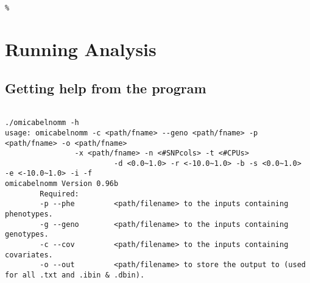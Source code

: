 \documentclass{report}
\begin{document}
\begin{lstlisting}[escapechar=\%]


%
\end{lstlisting}

\chapter{Running Analysis}

\section{Getting help from the program}

\begin{lstlisting}[escapechar=\%]

./omicabelnomm -h
usage: omicabelnomm -c <path/fname> --geno <path/fname> -p <path/fname> -o <path/fname>
                -x <path/fname> -n <#SNPcols> -t <#CPUs>
                         -d <0.0~1.0> -r <-10.0~1.0> -b -s <0.0~1.0>  -e <-10.0~1.0> -i -f
omicabelnomm Version 0.96b
        Required:
        -p --phe         <path/filename> to the inputs containing phenotypes.
        -g --geno        <path/filename> to the inputs containing genotypes.
        -c --cov         <path/filename> to the inputs containing covariates.
        -o --out         <path/filename> to store the output to (used for all .txt and .ibin & .dbin).


\end{lstlisting}
\end{document}
